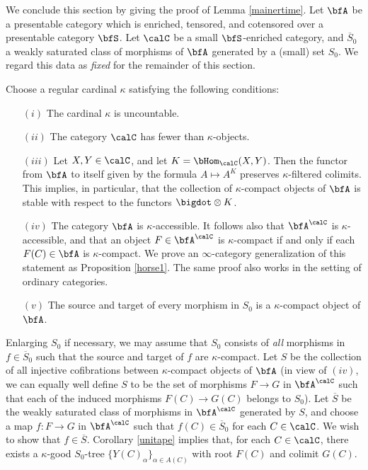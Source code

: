 We conclude this section by giving the proof of Lemma \ref{mainertime}. 
Let $\bfA$ be a presentable category which is enriched, tensored, and cotensored over a presentable category $\bfS$. Let $\calC$ be a small $\bfS$-enriched category, and $\overline{S}_0$ a weakly saturated class of morphisms of $\bfA$ generated by a (small) set $S_0$. We regard this data as {\em fixed} for the remainder of this section.

Choose a regular cardinal $\kappa$ satisfying the following conditions:
\begin{itemize}
\item[$(i)$] The cardinal $\kappa$ is uncountable.

\item[$(ii)$] The category $\calC$ has fewer than $\kappa$-objects.

\item[$(iii)$] Let $X,Y \in \calC$, and let $K = \bHom_{\calC}(X,Y)$. Then the functor
from $\bfA$ to itself given by the formula $A \mapsto A^{K}$ preserves $\kappa$-filtered colimits.
This implies, in particular, that the collection of $\kappa$-compact objects of $\bfA$ is stable with respect to the functors $\bigdot \otimes K$.

\item[$(iv)$] The category $\bfA$ is $\kappa$-accessible. It follows also that $\bfA^{\calC}$ is
$\kappa$-accessible, and that an object $F \in \bfA^{\calC}$ is $\kappa$-compact if and only if
each $F(C) \in \bfA$ is $\kappa$-compact. We prove an $\infty$-category generalization of this
statement as Proposition \ref{horse1}. The same proof also works in the setting of ordinary categories.

\item[$(v)$] The source and target of every morphism in $S_0$ is a $\kappa$-compact object of $\bfA$.
\end{itemize}

Enlarging $S_0$ if necessary, we may assume that $S_0$ consists of {\em all} morphisms in
$f \in \overline{S}_0$ such that the source and target of $f$ are $\kappa$-compact.
Let $S$ be the collection of all injective cofibrations between $\kappa$-compact objects of $\bfA$ (in view of $(iv)$, we can equally well define $S$ to be the set of morphisms $F \rightarrow G$ in
$\bfA^{\calC}$ such that each of the induced morphisms $F(C) \rightarrow G(C)$ belongs to $S_0$). Let $\overline{S}$ be the weakly saturated class of morphisms in $\bfA^{\calC}$ generated by $S$, and choose a map $f: F \rightarrow G$ in $\bfA^{\calC}$ such that $f(C) \in \overline{S}_0$ for each $C \in \calC$. We wish to show that
$f \in \overline{S}$. Corollary \ref{unitape} implies that, for each $C \in \calC$, there exists a $\kappa$-good $S_0$-tree $\{ Y(C)_{\alpha} \}_{\alpha \in A(C)}$ with root $F(C)$ and colimit $G(C)$.

